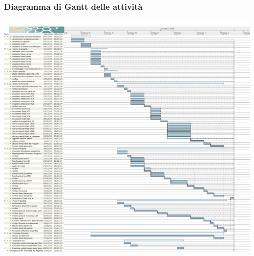 	\subsubsection{Diagramma di Gantt delle attività}
		\includegraphics[scale=0.27]{PianoDiProgetto/Pics/FaseA.png}
